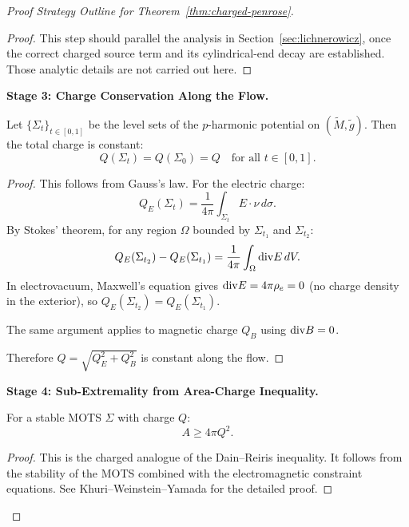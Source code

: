 \begin{proof}[Proof Strategy Outline for Theorem~\ref{thm:charged-penrose}]
\begin{proof}
This step should parallel the analysis in Section~\ref{sec:lichnerowicz}, once the correct charged source term and its cylindrical-end decay are established. Those analytic details are not carried out here.
\end{proof}

\textbf{Stage 3: Charge Conservation Along the Flow.}

\begin{lemma}\label{lem:charge-conserve}
Let $\{\Sigma_t\}_{t \in [0,1]}$ be the level sets of the $p$-harmonic potential on $(\tilde{M}, \tilde{g})$. Then the total charge is constant:
\begin{equation}
    Q(\Sigma_t) = Q(\Sigma_0) = Q \quad \text{for all } t \in [0,1].
\end{equation}
\end{lemma}

\begin{proof}
This follows from Gauss's law. For the electric charge:
\[
Q_E(\Sigma_t) = \frac{1}{4\pi}\int_{\Sigma_t} E \cdot \nu \, d\sigma.
\]
By Stokes' theorem, for any region $\Omega$ bounded by $\Sigma_{t_1}$ and $\Sigma_{t_2}$:
\[
Q_E(\Sigma_{t_2}) - Q_E(\Sigma_{t_1}) = \frac{1}{4\pi}\int_\Omega \mathrm{div} E \, dV.
\]
In electrovacuum, Maxwell's equation gives $\mathrm{div} E = 4\pi \rho_e = 0$ (no charge density in the exterior), so $Q_E(\Sigma_{t_2}) = Q_E(\Sigma_{t_1})$.

The same argument applies to magnetic charge $Q_B$ using $\mathrm{div} B = 0$.

Therefore $Q = \sqrt{Q_E^2 + Q_B^2}$ is constant along the flow.
\end{proof}

\textbf{Stage 4: Sub-Extremality from Area-Charge Inequality.}

\begin{lemma}\label{lem:area-charge-subext}
For a stable MOTS $\Sigma$ with charge $Q$:
\begin{equation}
    A \geq 4\pi Q^2.
\end{equation}
\end{lemma}

\begin{proof}
This is the charged analogue of the Dain--Reiris inequality. It follows from the stability of the MOTS combined with the electromagnetic constraint equations. See Khuri--Weinstein--Yamada \cite{khuri2017} for the detailed proof.


\end{proof}
\end{proof}
